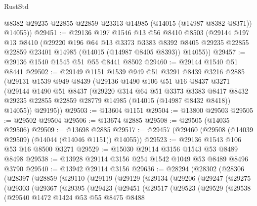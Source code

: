 \begin{lexlean}{RustStd}
\begin{coremodule}
        @8382
        @29235
        @22855
        @22859
        @23313
        @14985
        (@14015 (@14987 @8382 @8371))
        @14055))
@29451 := @29136
    @197
    @1546
    @13
    @56
    @8410
    @8503
    (@29144
      @197
      @13
      @8410
      (@29220
        @196
        @64
        @13
        @3373
        @3383
        @8392
        @8405
        @29235
        @22855
        @22859
        @23401
        @14985
        (@14015 (@14987 @8405 @8393))
        @14055))
@29457 := @29136 @1540 @1545 @51 @55 @8441 @8502
@29460 := @29144 @1540 @51 @8441
@29502 := @29149
    @1151
    @1539
    @949
    @51
    @3291
    @8439
    @3216
    @2885
    (@29131
      @1539
      @949
      @8439
      (@29136
        @1490
        @106
        @51
        @16
        @8437
        @3271
        (@29144
          @1490
          @51
          @8437
          (@29220
            @314
            @64
            @51
            @3373
            @3383
            @8417
            @8432
            @29235
            @22855
            @22859
            @28779
            @14985
            (@14015 (@14987 @8432 @8418))
            @14055))
        @29195))
@29503 := @13604 @1151
@29504 := @13800 @29503
@29505 := @29502 @29504
@29506 := @13674 @2885
@29508 := @29505 (@14035 @29506)
@29509 := @13698 @2885
@29517 := @29457 (@29460 (@29508 (@14039 @29509) (@14044 (@14046 @1151)) @14055))
@29523 := @29136 @1543 @106 @53 @16 @8500 @3271
@29529 := @15030 @29114 @3156 @1543 @53 @8489 @8498
@29538 := @13928 @29114 @3156 @254 @1542 @1049 @53 @8489 @8496 @3790
@29540 := @13942 @29114 @3156
@29636 := @28294
    (@28302
      (@28306
        (@28397
          (@28859
            (@29110
              (@29119
                (@29129
                  (@29134
                    (@29206
                      (@29247
                        (@29275
                          (@29303
                            (@29367
                              (@29395
                                (@29423
                                  (@29451
                                    (@29517
                                      (@29523
                                        (@29529
                                          (@29538
                                            (@29540
                                              @1472
                                              @1424
                                              @53
                                              @55
                                              @8475
                                              @8488

\end{coremodule}
\end{lexlean}
